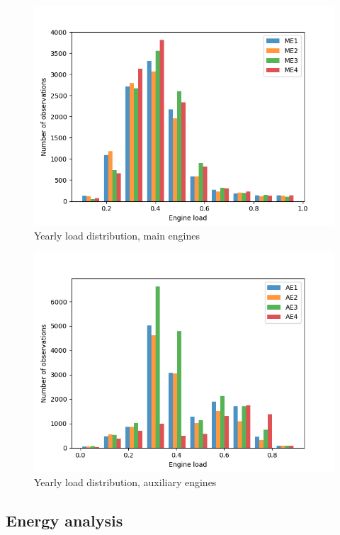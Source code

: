 \documentclass[preprint,12pt]{elsarticle}
\begin{document}
\begin{figure}[htbp]
	\centering
	\includegraphics[width=0.8\linewidth]{Figures/Hist_mainEngines}
	\caption{Yearly load distribution, main engines}
	\label{fig:loadME_hist}
\end{figure}

\begin{figure}[htbp]
	\centering
	\includegraphics[width=0.8\linewidth]{Figures/Hist_auxEngines}
	\caption{Yearly load distribution, auxiliary engines}
	\label{fig:loadAE_hist}
\end{figure}




\subsection{Energy analysis} \label{sec:res:energy}
\end{document}
